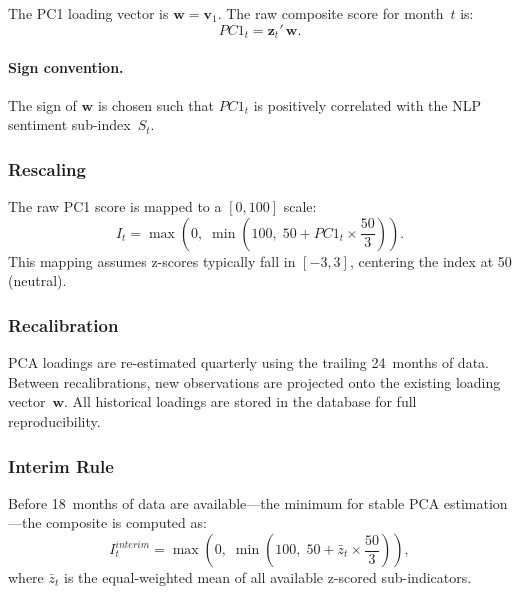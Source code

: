 \documentclass[11pt]{article}
\begin{document}
The PC1 loading vector is $\mathbf{w} = \mathbf{v}_1$.  The raw
composite score for month~$t$ is:
\begin{equation}\label{eq:pc1}
  PC1_t = \mathbf{z}_t' \,\mathbf{w}.
\end{equation}

\paragraph{Sign convention.}  The sign of $\mathbf{w}$ is chosen such
that $PC1_t$ is positively correlated with the NLP sentiment
sub-index~$S_t$.

\subsubsection{Rescaling}

The raw PC1 score is mapped to a $[0,100]$ scale:
\begin{equation}\label{eq:rescale}
  I_t = \max\!\left(0,\;\min\!\left(100,\;
        50 + PC1_t \times \frac{50}{3}\right)\right).
\end{equation}
This mapping assumes z-scores typically fall in $[-3,3]$, centering
the index at 50 (neutral).

\subsubsection{Recalibration}

PCA loadings are re-estimated quarterly using the trailing 24~months
of data.  Between recalibrations, new observations are projected onto
the existing loading vector~$\mathbf{w}$.  All historical loadings
are stored in the database for full reproducibility.

\subsubsection{Interim Rule}

Before 18~months of data are available---the minimum for stable PCA
estimation---the composite is computed as:
\begin{equation}\label{eq:interim}
  I_t^{interim} = \max\!\left(0,\;\min\!\left(100,\;
                  50 + \bar{z}_t \times \frac{50}{3}\right)\right),
\end{equation}
where $\bar{z}_t$ is the equal-weighted mean of all available
z-scored sub-indicators.

\end{document}
